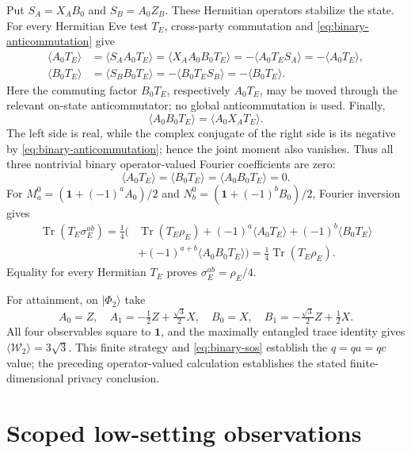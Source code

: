 \documentclass[11pt]{article}
\theoremstyle{definition}
\theoremstyle{remark}
\newcommand{\Id}{\mathbf 1}
\newcommand{\Tr}{\operatorname{Tr}}
\begin{document}
Put \(S_A=X_AB_0\) and \(S_B=A_0Z_B\).  These Hermitian operators stabilize
the state.  For every Hermitian Eve test \(T_E\), cross-party commutation and
\eqref{eq:binary-anticommutation} give
\[
\begin{aligned}
 \langle A_0T_E\rangle
 &=\langle S_AA_0T_E\rangle
 =\langle X_AA_0B_0T_E\rangle
 =-\langle A_0T_ES_A\rangle
 =-\langle A_0T_E\rangle,\\
 \langle B_0T_E\rangle
 &=\langle S_BB_0T_E\rangle
 =-\langle B_0T_ES_B\rangle
 =-\langle B_0T_E\rangle.
\end{aligned}
\]
Here the commuting factor \(B_0T_E\), respectively \(A_0T_E\), may be
moved through the relevant on-state anticommutator; no global
anticommutation is used.  Finally,
\[
 \langle A_0B_0T_E\rangle=\langle A_0X_AT_E\rangle.
\]
The left side is real, while the complex conjugate of the right side is its
negative by \eqref{eq:binary-anticommutation}; hence the joint moment also
vanishes.  Thus all three nontrivial binary operator-valued Fourier
coefficients are zero:
\[
 \langle A_0T_E\rangle=
 \langle B_0T_E\rangle=
 \langle A_0B_0T_E\rangle=0.
\]
For
\(M_a^0=(\Id+(-1)^aA_0)/2\) and
\(N_b^0=(\Id+(-1)^bB_0)/2\), Fourier inversion gives
\[
\begin{aligned}
 \Tr(T_E\sigma_E^{ab})=\frac14\bigl(&\Tr(T_E\rho_E)
 +(-1)^a\langle A_0T_E\rangle+(-1)^b\langle B_0T_E\rangle\\
 &+(-1)^{a+b}\langle A_0B_0T_E\rangle\bigr)
 =\frac14\Tr(T_E\rho_E).
\end{aligned}
\]
Equality for every Hermitian \(T_E\) proves
\(\sigma_E^{ab}=\rho_E/4\).

For attainment, on \(\lvert\Phi_2\rangle\) take
\[
 A_0=Z,
 \quad A_1=-\tfrac12Z+\tfrac{\sqrt3}{2}X,
 \quad B_0=X,
 \quad B_1=-\tfrac{\sqrt3}{2}Z+\tfrac12X.
\]
All four observables square to \(\Id\), and the maximally entangled trace
identity gives \(\langle\mathcal W_2\rangle=3\sqrt3\).  This finite strategy
and \eqref{eq:binary-sos} establish the \(q=qa=qc\) value; the preceding
operator-valued calculation establishes the stated finite-dimensional
privacy conclusion.

\section{Scoped low-setting observations}
\label{app:settings}
\end{document}
